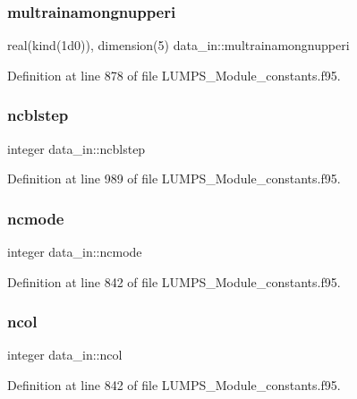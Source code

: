 \subsubsection{\texorpdfstring{multrainamongnupperi}{multrainamongnupperi}}
{\footnotesize\ttfamily real(kind(1d0)), dimension(5) data\+\_\+in\+::multrainamongnupperi}



Definition at line 878 of file L\+U\+M\+P\+S\+\_\+\+Module\+\_\+constants.\+f95.

\mbox{\label{namespacedata__in_ad8e5dc33bb1aacb37406f71ac93929ba}} 
\subsubsection{\texorpdfstring{ncblstep}{ncblstep}}
{\footnotesize\ttfamily integer data\+\_\+in\+::ncblstep}



Definition at line 989 of file L\+U\+M\+P\+S\+\_\+\+Module\+\_\+constants.\+f95.

\mbox{\label{namespacedata__in_a8c3e4136805b6c64af2129539988ed09}} 
\subsubsection{\texorpdfstring{ncmode}{ncmode}}
{\footnotesize\ttfamily integer data\+\_\+in\+::ncmode}



Definition at line 842 of file L\+U\+M\+P\+S\+\_\+\+Module\+\_\+constants.\+f95.

\mbox{\label{namespacedata__in_abcffd65e274aa3e20c73561543853e19}} 
\subsubsection{\texorpdfstring{ncol}{ncol}}
{\footnotesize\ttfamily integer data\+\_\+in\+::ncol}



Definition at line 842 of file L\+U\+M\+P\+S\+\_\+\+Module\+\_\+constants.\+f95.

